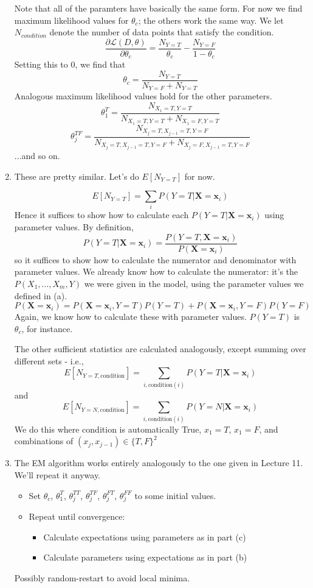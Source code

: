 \documentclass{article}
\newcommand{\dee}[2]{\frac{\partial{#1}}{\partial{#2}}}
\begin{document}
\begin{enumerate}
  Note that all of the paramters have basically the same form. For now
  we find maximum likelihood values for $\theta_c$; the others work the
  same way.  We let $N_{condition}$ denote the number of data points
  that satisfy the condition.
  $$\dee{\mathcal
    L(D,\theta)}{\theta_c}=\frac{N_{Y=T}}{\theta_c}-\frac{N_{Y=F}}{1-\theta_c}$$
  Setting this to 0, we find that
  $$\theta_c=\frac{N_{Y=T}}{N_{Y=F}+N_{Y=T}}$$
  Analogous maximum likelihood values hold for the other parameters. 
  $$\theta_1^T=\frac{N_{X_1=T,Y=T}}{N_{X_1=T,Y=T}+N_{X_1=F,Y=T}}$$
  $$\theta_j^{TF}=\frac{N_{X_j=T,X_{j-1}=T,Y=F}}{N_{X_j=T,X_{j-1}=T,Y=F}+N_{X_j=F,X_{j-1}=T,Y=F}}$$
  ...and so on. 
\item These are pretty similar. Let's do $E[N_{Y=T}]$ for now. 

  $$E[N_{Y=T}]=\sum_i P(Y=T|\mathbf X = \mathbf x_i)$$ Hence it
  suffices to show how to calculate each $P(Y=T|\mathbf X=\mathbf
  x_i)$ using parameter values. By definition,
  \[P(Y=T|\mathbf X = \mathbf x_i)=\frac{P(Y=T, \mathbf X = \mathbf x_i)}{P(\mathbf X = \mathbf x_i)}\]
  so it suffices to show how to calculate the numerator and
  denominator with parameter values. We already know how to calculate
  the numerator: it's the $P(X_1,\ldots,X_m,Y)$ we were given in the
  model, using the parameter values we defined in (a).
  \[P(\mathbf X = \mathbf x_i)=P(\mathbf X = \mathbf x_i, Y=T)P(Y=T)+P(\mathbf X = \mathbf x_i, Y=F)P(Y=F)\]
  Again, we know how to calculate these with parameter
  values. $P(Y=T)$ is $\theta_c$, for instance.

  The other sufficient statistics are calculated analogously, except
  summing over different sets - i.e.,
  \[E[N_{Y=T,\mathrm{condition}}]=\sum_{i, \mathrm{condition}(i)} P(Y=T|\mathbf X=\mathbf x_i)\]
  and
  \[E[N_{Y=N,\mathrm{condition}}]=\sum_{i, \mathrm{condition}(i)} P(Y=N|\mathbf X=\mathbf x_i)\]
  We do this where condition is automatically True, $x_1=T$, $x_1=F$,
  and combinations of $(x_j,x_{j-1})\in \{T,F\}^2$

\item The EM algorithm works entirely analogously to the one given in Lecture 
  11. We'll repeat it anyway.
  \begin{itemize}
  \item Set $\theta_c$, $\theta^T_1$, $\theta^{TT}_j$, $\theta^{TF}_j$, 
    $\theta^{FT}_j$, $\theta^{FF}_j$ to some initial values.
  \item Repeat until convergence:
    \begin{itemize}
    \item Calculate expectations using parameters as in part (c)
    \item Calculate parameters using expectations as in part (b)
    \end{itemize}
  \end{itemize}
  Possibly random-restart to avoid local minima.


\end{enumerate}
\end{document}
